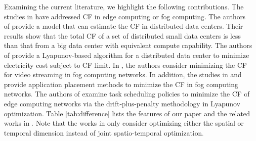 \documentclass[conference, 10pt, ﬁnal, letterpaper, twocolumn]{IEEEtran}
\begin{document}
Examining the current literature, we highlight the following contributions. The studies in \cite{van2012distributed, Rad2022Carbon, do2015proximal, aldossary2021towards, ahvar2021deca, yang2022carbon} have addressed CF in edge computing or fog computing. The authors of \cite{van2012distributed} provide a model that can estimate the CF in distributed data centers. Their results show that the total CF of a set of distributed small data centers is less than that from a big data center with equivalent compute capability. The authors of \cite{Rad2022Carbon} provide a Lyapunov-based algorithm for a distributed data center to minimize electricity cost subject to CF limit. In \cite{do2015proximal}, the authors consider minimizing the CF for video streaming in fog computing networks. In addition, the studies in \cite{aldossary2021towards} and \cite{ahvar2021deca} provide application placement methods to minimize the CF in fog computing networks. The authors of \cite{yang2022carbon} examine task scheduling policies to minimize the CF of edge computing networks via the drift-plus-penalty methodology in Lyapunov optimization. Table \ref{tab:difference} lists the features of our paper and the related works in \cite{van2012distributed, Rad2022Carbon, do2015proximal, aldossary2021towards, ahvar2021deca, yang2022carbon}. Note that the works in \cite{van2012distributed, Rad2022Carbon, do2015proximal, aldossary2021towards, ahvar2021deca} only consider optimizing either the spatial or temporal dimension instead of joint spatio-temporal optimization. 


\end{document}

